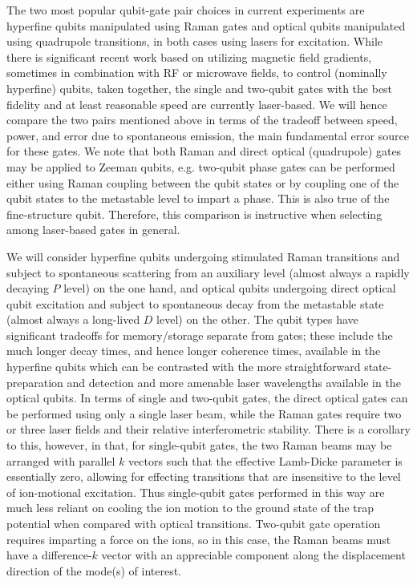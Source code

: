 \documentclass[%
reprint,
 amsmath,amssymb,
]{revtex4-1}
\begin{document}
The two most popular qubit-gate pair choices in current experiments are hyperfine qubits manipulated using Raman gates and optical qubits manipulated using quadrupole transitions, in both cases using lasers for excitation.  While there is significant recent work based on utilizing magnetic field gradients, sometimes in combination with RF or microwave fields, to control (nominally hyperfine) qubits, taken together, the single and two-qubit gates with the best fidelity and at least reasonable speed are currently laser-based.  We will hence compare the two pairs mentioned above in terms of the tradeoff between speed, power, and error due to spontaneous emission, the main fundamental error source for these gates.  We note that both Raman and direct optical (quadrupole) gates may be applied to Zeeman qubits, e.g. two-qubit phase gates can be performed either using Raman coupling between the qubit states or by coupling one of the qubit states to the metastable level to impart a phase.  This is also true of the fine-structure qubit.  Therefore, this comparison is instructive when selecting among laser-based gates in general.

We will consider hyperfine qubits undergoing stimulated Raman transitions and subject to spontaneous scattering from an auxiliary level (almost always a rapidly decaying $P$ level) on the one hand, and optical qubits undergoing direct optical qubit excitation and subject to spontaneous decay from the metastable state (almost always a long-lived $D$ level) on the other.  The qubit types have significant tradeoffs for memory/storage separate from gates; these include the much longer decay times, and hence longer coherence times, available in the hyperfine qubits which can be contrasted with the more straightforward state-preparation and detection and more amenable laser wavelengths available in the optical qubits.  In terms of single and two-qubit gates, the direct optical gates can be performed using only a single laser beam, while the Raman gates require two or three laser fields and their relative interferometric stability.  There is a corollary to this, however, in that, for single-qubit gates, the two Raman beams may be arranged with parallel $k$ vectors such that the effective Lamb-Dicke parameter is essentially zero, allowing for effecting transitions that are insensitive to the level of ion-motional excitation.  Thus single-qubit gates performed in this way are much less reliant on cooling the ion motion to the ground state of the trap potential when compared with optical transitions.  Two-qubit gate operation requires imparting a force on the ions, so in this case, the Raman beams must have a difference-$k$ vector with an appreciable component along the displacement direction of the mode(s) of interest.
\end{document}
